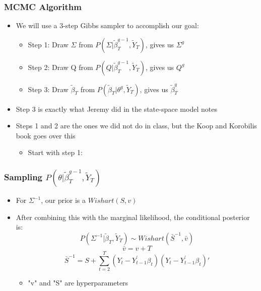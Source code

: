 \scshape\documentclass[xcolor=svgnames]{beamer}
\begin{document}
\begin{frame}
\frametitle{MCMC Algorithm}
\begin{itemize}
	\item  We will use a 3-step Gibbs sampler to accomplish our goal:
	\begin{itemize}
		\item  Step 1: Draw $\Sigma$ from $P(\Sigma|\tilde{\beta}_T^{g-1},\tilde{Y}_T)$, gives us $\Sigma^g$
		\item  Step 2: Draw Q from $P(Q|\tilde{\beta}_T^{g-1},\tilde{Y}_T)$, gives us $Q^g$
		\item  Step 3: Draw $\tilde{\beta}_T$ from $P(\tilde{\beta}_T|\theta^g,\tilde{Y}_T)$, gives us $\tilde{\beta}_T^g$
	\end{itemize}
	\vspace{0.1 in}
	\item  Step 3 is exactly what Jeremy did in the state-space model notes
	\vspace{0.1 in}
	\item  Steps 1 and 2 are the ones we did not do in class, but the Koop and Korobilis book goes over this
	\begin{itemize}
		\item  Start with step 1:
	\end{itemize}
\end{itemize}
\end{frame}

\begin{frame}
\frametitle{Sampling $P(\theta|\tilde{\beta}_T^{g-1},\tilde{Y}_T)$}
\begin{itemize}
	\item  For $\Sigma^{-1}$, our prior is a $Wishart(S,v)$
	\item  After combining this with the marginal likelihood, the conditional posterior is:
	\vspace{0.1 in}
		$$P(\Sigma^{-1}|\tilde{\beta}_T,\tilde{Y}_T) \sim Wishart(\bar{S}^{-1},\bar{v})$$ 
			$$\bar{v} = v + T$$
			$$\bar{S}^{-1} = S + \sum\limits_{t=2}^{T} (Y_t-Y_{t-1}^{'}\beta_t)(Y_t-Y_{t-1}^{'}\beta_t)'$$
	\begin{itemize}
		\item "v" and "S" are hyperparameters
	\end{itemize}
\end{itemize}
\end{frame}
\end{document}
